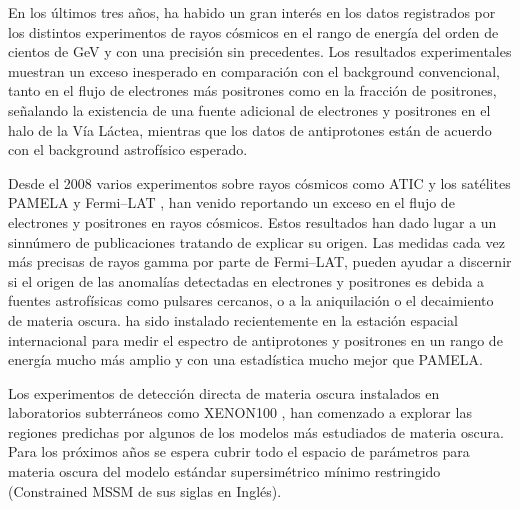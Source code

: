 En los últimos tres años, ha habido un gran interés en los datos
registrados por los distintos experimentos de rayos cósmicos en el
rango de energía del orden de cientos de GeV y con una precisión sin
precedentes. Los resultados experimentales muestran un exceso
inesperado en comparación con el background convencional, tanto en el
flujo de electrones más positrones como en la fracción de positrones,
señalando la existencia de una fuente adicional de electrones y
positrones en el halo de la Vía Láctea, mientras que los datos de
antiprotones están de acuerdo con el background astrofísico esperado. 

Desde el 2008 varios experimentos sobre rayos cósmicos como ATIC
\cite{:2008zzr} y los satélites PAMELA \cite{Adriani:2008zr} y
Fermi--LAT \cite{Abdo:2009zk}, han venido reportando un exceso en el
flujo de electrones y positrones en rayos cósmicos. 
%
Estos resultados
han dado lugar a un sinnúmero de publicaciones tratando de explicar su
origen. Las medidas cada vez más precisas de rayos gamma por parte de
Fermi--LAT, pueden ayudar a discernir si el origen de las anomalías
detectadas en electrones y positrones es debida a fuentes astrofísicas
como pulsares cercanos, o a la aniquilación o el decaimiento de
materia oscura. 
ha sido instalado recientemente en la estación espacial internacional
para medir el espectro de antiprotones y positrones en un rango de
energía mucho más amplio y con una estadística mucho mejor que PAMELA.

Los experimentos de detección directa de materia oscura instalados en
laboratorios subterráneos como XENON100 \cite{Aprile:2011ts}, han
comenzado a explorar las regiones predichas por algunos de los modelos
más estudiados de materia oscura. Para los próximos años se espera
cubrir todo el espacio de parámetros para materia oscura del modelo
estándar supersimétrico mínimo restringido (Constrained MSSM de sus
siglas en Inglés).  


